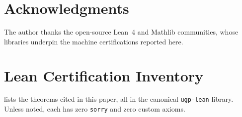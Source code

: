 \documentclass[11pt]{article}
\theoremstyle{remark}
\begin{document}
\section*{Acknowledgments}
The author thanks the open-source Lean~4 and Mathlib communities, whose libraries
underpin the machine certifications reported here.

\appendix

\section{Lean Certification Inventory}
\label{app:lean}

 lists the theorems cited in this paper, all in the canonical
\texttt{ugp-lean} library. Unless noted, each has zero \texttt{sorry} and zero
custom axioms.
\end{document}
